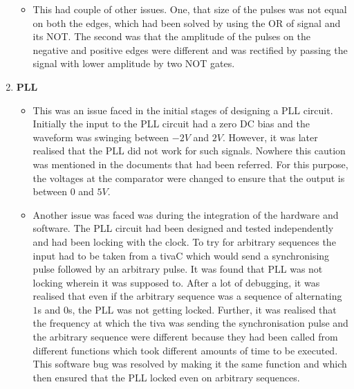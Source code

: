 \documentclass{article}
\begin{document}
\begin{enumerate}
\begin{itemize}
  \item This had couple of other issues. One, that size of the pulses was not equal on both the edges, which had been solved by using the OR of signal and its NOT. The second was that the amplitude of the pulses on the negative and positive edges were different and was rectified by passing the signal with lower amplitude by two NOT gates.
  \end{itemize}
\item \textbf{PLL}
  \begin{itemize}
  \item This was an issue faced in the initial stages of designing a PLL circuit. Initially the input to the PLL circuit had a zero DC bias and the waveform was swinging between $-2 V$ and $ 2 V$. However, it was later realised that the PLL did not work for such signals. Nowhere this caution was mentioned in the documents that had been referred. For this purpose, the voltages at the comparator were changed to ensure that the output is between $0$ and $5 V$.
  \item Another issue was faced was during the integration of the hardware and software. The PLL circuit had been designed and tested independently and had been locking with the clock. To try for arbitrary sequences the input had to be taken from a tivaC which would send a synchronising pulse followed by an arbitrary pulse. It was found that PLL was not locking wherein it was supposed to. After a lot of debugging, it was realised that even if the arbitrary sequence was a sequence of alternating $1$s and $0$s, the PLL was not getting locked. Further, it was realised that the frequency at which the tiva was sending the synchronisation pulse and the arbitrary sequence were different because they had been called from different functions which took different amounts of time to be executed. This software bug was resolved by making it the same function and which then ensured that the PLL locked even on arbitrary sequences.
  \end{itemize}
\end{enumerate}
\end{document}
